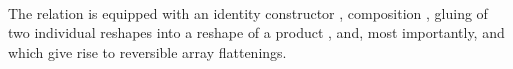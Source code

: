 \begin{code}
\AgdaSymbol{(}\AgdaSpace{}%
\AgdaOperator{\AgdaPrimitive{*}}\AgdaSpace{}%
\AgdaSymbol{))}\AgdaSpace{}%
\AgdaSymbol{(}\AgdaSpace{}%
\AgdaSpace{}%
\AgdaSpace{}%
\AgdaSpace{}%
\AgdaSymbol{)}\<%
\\
%
\>[4]%
\>[11]\AgdaSymbol{:}\AgdaSpace{}%
\AgdaSpace{}%
\AgdaSymbol{(}\AgdaSpace{}%
\AgdaSpace{}%
\AgdaSpace{}%
\AgdaSpace{}%
\AgdaSymbol{)}\AgdaSpace{}%
\AgdaSymbol{(}\AgdaSpace{}%
\AgdaSymbol{(}\AgdaSpace{}%
\AgdaOperator{\AgdaPrimitive{*}}\AgdaSpace{}%
\AgdaSymbol{))}\<%
\end{code}
The relation is equipped with an identity constructor , composition
, gluing of two individual reshapes into a reshape of a product
, and, most importantly,  and  which give rise to
reversible array flattenings.

